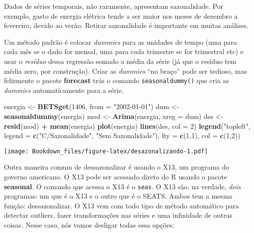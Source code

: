 \documentclass[]{book}
\newenvironment{Shaded}{\begin{snugshade}}{\end{snugshade}}
\newcommand{\KeywordTok}[1]{\textcolor[rgb]{0.13,0.29,0.53}{\textbf{#1}}}
\newcommand{\DataTypeTok}[1]{\textcolor[rgb]{0.13,0.29,0.53}{#1}}
\newcommand{\DecValTok}[1]{\textcolor[rgb]{0.00,0.00,0.81}{#1}}
\newcommand{\StringTok}[1]{\textcolor[rgb]{0.31,0.60,0.02}{#1}}
\newcommand{\OperatorTok}[1]{\textcolor[rgb]{0.81,0.36,0.00}{\textbf{#1}}}
\newcommand{\NormalTok}[1]{#1}
\begin{document}
Dados de séries temporais, não raramente, apresentam sazonalidade. Por
exemplo, gasto de energia elétrica tende a ser maior nos meses de
dezembro a fevereiro, devido ao verão. Retirar sazonalidade é importante
em muitas análises.

Um método padrão é colocar \emph{dummies} para as unidades de tempo (uma
para cada mês se o dado for mensal, uma para cada trimestre se for
trimestral etc) e usar o \emph{resíduo} dessa regressão somado a média
da série (já que o resíduo tem média zero, por construção). Criar as
\emph{dummies} ``no braço'' pode ser tedioso, mas felizmente o pacote
\textbf{forecast} trás o comando \texttt{seasonaldummy()} que cria as
\emph{dummies} automaticamente para a série.

\begin{Shaded}
\begin{Highlighting}[]
\NormalTok{energia <-}\StringTok{ }\KeywordTok{BETSget}\NormalTok{(}\DecValTok{1406}\NormalTok{, }\DataTypeTok{from =} \StringTok{"2002-01-01"}\NormalTok{)}
\NormalTok{dum <-}\StringTok{ }\KeywordTok{seasonaldummy}\NormalTok{(energia)}
\NormalTok{mod <-}\StringTok{ }\KeywordTok{Arima}\NormalTok{(energia, }\DataTypeTok{xreg =}\NormalTok{ dum)}
\NormalTok{des <-}\StringTok{ }\KeywordTok{resid}\NormalTok{(mod) }\OperatorTok{+}\StringTok{ }\KeywordTok{mean}\NormalTok{(energia)}
\KeywordTok{plot}\NormalTok{(energia)}
\KeywordTok{lines}\NormalTok{(des, }\DataTypeTok{col =} \DecValTok{2}\NormalTok{)}
\KeywordTok{legend}\NormalTok{(}\StringTok{"topleft"}\NormalTok{, }\DataTypeTok{legend =} \KeywordTok{c}\NormalTok{(}\StringTok{"C/Sazonalidade"}\NormalTok{, }\StringTok{"Sem Sazonalidade"}\NormalTok{), }\DataTypeTok{lty =} \KeywordTok{c}\NormalTok{(}\DecValTok{1}\NormalTok{,}\DecValTok{1}\NormalTok{), }\DataTypeTok{col =} \KeywordTok{c}\NormalTok{(}\DecValTok{1}\NormalTok{,}\DecValTok{2}\NormalTok{))}
\end{Highlighting}
\end{Shaded}

\texttt{[image: Bookdown\_files/figure-latex/desazonalizando-1.pdf]}

Outra maneira comum de dessazonalizar é usando o X13, um programa do
governo americano. O X13 pode ser acessado direto do R usando o pacote
\textbf{seasonal}. O comando que acessa o X13 é o \texttt{seas}. O X13
são, na verdade, \emph{dois} programas: um que é o X13 e o outro que é o
SEATS. Ambos tem a mesma função: dessazonalizar. O X13 vem com todo tipo
de método automático para detectar outliers, fazer transformações nas
séries e uma infinidade de outras coisas. Nesse caso, nós vamos desligar
todas essa opções:
\end{document}
